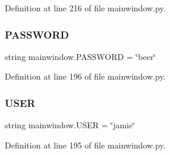 Definition at line 216 of file mainwindow.\+py.

\mbox{\label{namespacemainwindow_a9c35ad9c903521379a9dc1171bbe11b4}} 
\subsubsection{\texorpdfstring{PASSWORD}{PASSWORD}}
{\footnotesize\ttfamily string mainwindow.\+P\+A\+S\+S\+W\+O\+RD = \char`\"{}beer\char`\"{}}



Definition at line 196 of file mainwindow.\+py.

\mbox{\label{namespacemainwindow_a08ced40f6e9dec6e6baebf53dd6d2c6a}} 
\subsubsection{\texorpdfstring{USER}{USER}}
{\footnotesize\ttfamily string mainwindow.\+U\+S\+ER = \char`\"{}jamie\char`\"{}}



Definition at line 195 of file mainwindow.\+py.

